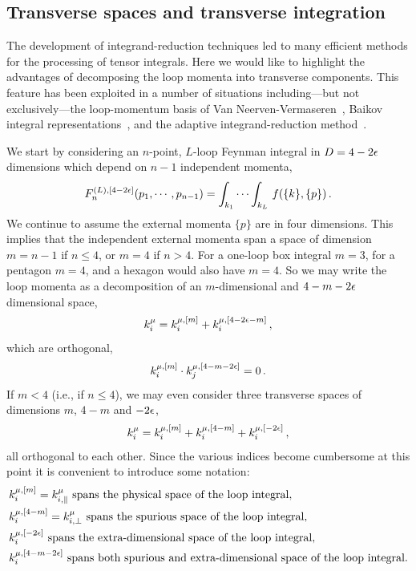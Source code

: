 \subsection{Transverse spaces and transverse integration \label{ssec:transverse}}

The development of integrand-reduction techniques led to many efficient
methods for the processing of tensor integrals. Here we would like to
highlight the advantages of decomposing the loop momenta into transverse
components. This feature has been exploited in a number of situations
including---but not exclusively---the loop-momentum basis of Van
Neerven-Vermaseren~\cite{ch3_vanNeerven:1983vr}, Baikov integral
representations~\cite{ch3_Baikov:1996rk},
and the adaptive integrand-reduction method~\cite{ch3_Mastrolia:2016dhn}.

We start by considering an $n$-point, $L$-loop Feynman integral in $D=4-2\epsilon$
dimensions which depend on $n-1$ independent momenta,
\begin{equation}
  F_n^{(L),[4-2\epsilon]}(p_1,\cdots,p_{n-1}) = \int_{k_1}\cdots\int_{k_L}  \,f(\{k\}, \{p\}) \,.
\end{equation}
We continue to assume the external momenta $\{p\}$ are in four
dimensions. This implies that the independent external momenta span a space of dimension $m=n-1$ if $n\le 4$, or $m=4$ if $n > 4$. For a one-loop
box integral $m=3$, for a pentagon $m=4$, and a hexagon would also have $m=4$.
So we may write the loop momenta as a decomposition of an $m$-dimensional and
$4-m-2\epsilon$ dimensional space,
\begin{equation}
  k_i^\mu = k_i^{\mu,[m]} + k_i^{\mu,[4-2\epsilon-m]} \,,
\end{equation}
which are orthogonal, 
\begin{equation}
  k_i^{\mu,[m]}\cdot k_j^{\mu,[4-m-2\epsilon]} = 0 \,.
\end{equation}
If $m<4$ (i.e., if $n \le 4$), we may even consider three transverse spaces of dimensions $m$, $4-m$ and $-2\epsilon$,
\begin{equation}
  k_i^\mu = k_i^{\mu,[m]} + k_i^{\mu,[4-m]} + k_i^{\mu,[-2\epsilon]} \,,
\end{equation}
all orthogonal to each other.
Since the various indices become cumbersome at this point it is convenient to introduce some notation:
\begin{align*}
  &k_i^{\mu,[m]} = k^\mu_{i,\parallel} \text{ spans the physical space of the loop integral},\\
  &k_i^{\mu,[4-m]} = k^\mu_{i,\perp} \text{ spans the spurious space of the loop integral},\\
  &k_i^{\mu,[-2\epsilon]} \text{ spans the extra-dimensional space of the loop integral},\\
  &k_i^{\mu,[4-m-2\epsilon]} \text{ spans both spurious and extra-dimensional space of the loop integral}.
\end{align*}
